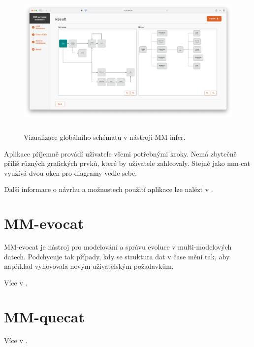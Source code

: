\begin{figure}[htb]
  \centering
  \includegraphics[height=75mm]{../img/mm-infer-result}
  \caption{Vizualizace globálního schématu v nástroji MM-infer.}
  \label{obr01:mm-infer-result}
\end{figure}

Aplikace příjemně provádí uživatele všemi potřebnými kroky. Nemá zbytečně příliš různých grafických prvků, které by uživatele zahlcovaly. Stejně jako mm-cat využívá dvou oken pro diagramy vedle sebe.

Další informace o návrhu a možnostech použití aplikace lze nalézt v \citet{MMinfer}.

\section{MM-evocat}

MM-evocat je nástroj pro modelování a správu evoluce v multi-modelových datech. Podchycuje tak případy, kdy se struktura dat v čase mění tak, aby například vyhovovala novým uživatelským požadavkům.





Více v \citet{MMevocat}.

\section{MM-quecat}

Více v \citet{MMquecat}.
